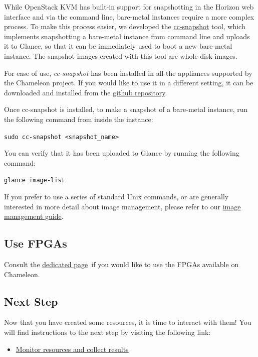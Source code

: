 While OpenStack KVM has built-in support for snapshotting in the Horizon
web interface and via the command line, bare-metal instances require a
more complex process. To make this process easier,{ we developed the
\href{https://github.com/ChameleonCloud/ChameleonSnapshotting}{cc-snapshot}
tool, which implements snapshotting a bare-metal instance from command
line and uploads it to Glance, so that it can be immediately used to
boot a new bare-metal instance. The snapshot images created with this
tool are whole disk images.}

{For ease of use, \emph{cc-snapshot} has been installed in all the
appliances supported by the Chameleon project. If you would like to use
it in a different setting, it can be downloaded and installed from the
\href{https://github.com/ChameleonCloud/ChameleonSnapshotting}{github
repository}.}

{Once cc-snapshot is installed, to make a snapshot of a bare-metal
instance, run the following command from inside the instance:}

{\texttt{sudo\ cc-snapshot\ \textless{}snapshot\_name\textgreater{}}}

{You can verify that it has been uploaded to Glance by running the
following command:}

{\texttt{glance\ image-list}}

{If you prefer to use a series of standard Unix commands, or are
generally interested in more detail about image management, please refer
to our
\href{https://www.chameleoncloud.org/docs/user-guides/ironic/\#snapshotting_an_instance}{image
management guide}.}

\subsection{Use FPGAs}

Consult the
\href{https://www.chameleoncloud.org/docs/bare-metal-user-guide/fpga/}{dedicated
page}~if you would like to use the FPGAs available on Chameleon.

\subsection{Next Step}

Now that you have created some resources, it is time to interact with
them! You will find instructions to the next step by visiting the
following link:

\begin{itemize}

\item
  \href{https://www.chameleoncloud.org/monitor-and-collect/}{Monitor
  resources and collect results}
\end{itemize}

